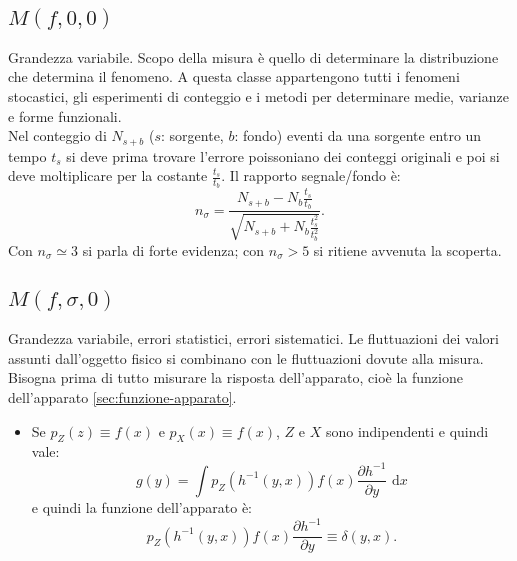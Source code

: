 \subsection{$M\left( f,0,0 \right) $} %
\label{subsec:f00}
Grandezza variabile. Scopo della misura è quello di determinare la distribuzione che determina il fenomeno. A questa classe appartengono tutti i fenomeni stocastici, gli esperimenti di conteggio e i metodi per determinare medie, varianze e forme funzionali.
\\ Nel conteggio di $N_{s+b}$ ($s$: sorgente, $b$: fondo) eventi da una sorgente entro un tempo $t_s$ si deve prima trovare l'errore poissoniano dei conteggi originali e poi si deve moltiplicare per la costante $\frac{t_s}{t_b}$. Il rapporto segnale/fondo è:
\begin{equation}
n_{ \sigma  }=\frac { { N }_{ s+b }-{ N }_{ b }\frac { { t }_{ s } }{ { t }_{ b } }  }{ \sqrt { { N }_{ s+b }+{ N }_{ b }\frac { { t }_{ s }^{ 2 } }{ { t }_{ b }^{ 2 } }  }  } .
\end{equation}
Con $n_\sigma \simeq 3$ si parla di forte evidenza; con $n_\sigma > 5$ si ritiene avvenuta la scoperta.

\subsection{$M\left( f,\sigma,0 \right) $} %
\label{subsec:fs0}
Grandezza variabile, errori statistici, errori sistematici. Le fluttuazioni dei valori assunti dall'oggetto fisico si combinano con le fluttuazioni dovute alla misura. 
\\ Bisogna prima di tutto misurare la risposta dell'apparato, cioè la funzione dell'apparato \ref{sec:funzione-apparato}.
\begin{itemize}
\item Se $p_Z(z)\equiv f(x)$ e $p_X(x)\equiv f(x)$, $Z$ e $X$ sono indipendenti e quindi vale:
\begin{equation}
g\left( y \right) =\int { { p }_{ Z }\left( { h }^{ -1 }\left( y,x \right)  \right) f\left( x \right) \frac { \partial { h }^{ -1 } }{ \partial y } \textrm{ d}x } 
\end{equation}
e quindi la funzione dell'apparato è:
\begin{equation}
{ p }_{ Z }\left( { h }^{ -1 }\left( y,x \right)  \right) f\left( x \right) \frac { \partial { h }^{ -1 } }{ \partial y } \equiv \delta \left( y,x \right) .
\end{equation}
\end{itemize}

